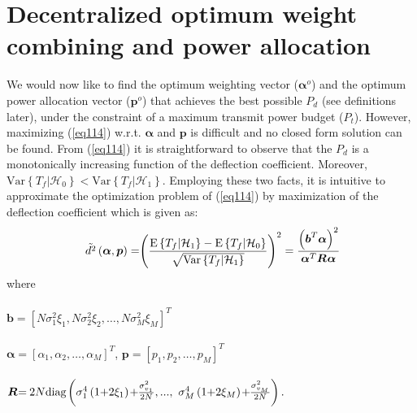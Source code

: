 \documentclass[conference]{IEEEtran}
\begin{document}
\section{Decentralized optimum weight combining and power allocation}
\label{Decentralized optimum weight combining and power allocation}
We would now like to find the optimum weighting vector ($\boldsymbol\alpha^o$) and the optimum power allocation vector ($\boldsymbol p^o$) that achieves the best possible $P_d$ (see definitions later), under the constraint of a maximum transmit power budget ($P_t$). However, maximizing  (\ref{eq114}) w.r.t. $\boldsymbol\alpha$ and $\boldsymbol p$ is difficult and no closed form solution can be found. From (\ref{eq114}) it is straightforward to observe that the $P_d$ is a monotonically increasing function of the deflection coefficient. Moreover, $\mathrm{Var}\left\{T_f|\mathcal{ H}_0\right\}<\mathrm{Var}\left\{T_f|\mathcal{ H}_1\right\}$. Employing these two facts, it is intuitive to approximate the optimization problem of (\ref{eq114}) by maximization of the deflection coefficient which is given as:
\begin{equation}\label{eq17}
\tilde{d^{2}}\left(\boldsymbol\alpha, \boldsymbol p \right)=\hspace{-0.1cm}\left(\frac{\mathrm{E}\left\{T_f|\mathcal{ H}_1\right\}-\mathrm{E}\left\{T_f|\mathcal{ H}_0\right\}}{\sqrt{\mathrm{Var}\left\{T_f|\mathcal{ H}_1\right\}}}\right)^{2}=\frac{\left(\boldsymbol b^T\boldsymbol  \alpha\right)^2}{\boldsymbol \alpha^T\boldsymbol R_{}\boldsymbol \alpha}\hspace{-0.1cm}
\end{equation}
where \\ \\
\hspace{-0.1cm}$\boldsymbol b=[N\sigma_1^{2}\xi_1,N\sigma_2^{2}\xi_2,\ldots,N\sigma_M^{2}\xi_M]^T$ \quad \\  \\
$\boldsymbol \alpha=[\alpha_1, \alpha_2, \ldots, \alpha_M]^T$, $\boldsymbol p=[p_1, p_2, \ldots, p_M]^T$ \\ \\
$\boldsymbol R_{}\hspace{-0.1cm}=\hspace{-0.02cm}2N \mathrm{diag}\hspace{-0.02cm}\left(\sigma_1^{4}\left(1\hspace{-0.08cm}+\hspace{-0.08cm}2\xi_1\right)\hspace{-0.05cm}+\hspace{-0.1cm}\frac{\sigma^{2}_{v_1}}{2N},... ,\ \sigma_M^{4}\left(1\hspace{-0.08cm}+\hspace{-0.08cm}2\xi_M\right)\hspace{-0.05cm}+\hspace{-0.1cm}\frac{\sigma^{2}_{v_M}}{2N}\right).\quad$   \\ \\
\end{document}
